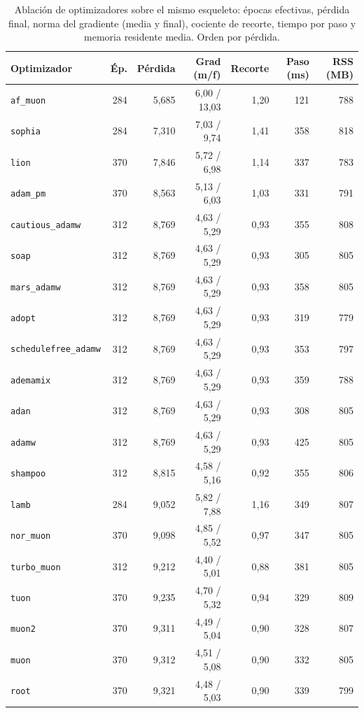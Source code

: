 \begin{table}[H]
\centering
\small
\caption{Ablación de optimizadores sobre el mismo esqueleto: épocas efectivas, pérdida final, norma del gradiente (media y final), cociente de recorte, tiempo por paso y memoria residente media. Orden por pérdida.}
\label{tab:r3-optimizers}
\begin{tabular}{lrrrrrr}
\toprule
Optimizador & Ép. & Pérdida & Grad (m/f) & Recorte & Paso (ms) & RSS (MB) \\
\midrule
\texttt{af\_muon} & 284 & 5,685 & 6,00 / 13,03 & 1,20 & 121 & 788 \\
\texttt{sophia} & 284 & 7,310 & 7,03 / 9,74 & 1,41 & 358 & 818 \\
\texttt{lion} & 370 & 7,846 & 5,72 / 6,98 & 1,14 & 337 & 783 \\
\texttt{adam\_pm} & 370 & 8,563 & 5,13 / 6,03 & 1,03 & 331 & 791 \\
\texttt{cautious\_adamw} & 312 & 8,769 & 4,63 / 5,29 & 0,93 & 355 & 808 \\
\texttt{soap} & 312 & 8,769 & 4,63 / 5,29 & 0,93 & 305 & 805 \\
\texttt{mars\_adamw} & 312 & 8,769 & 4,63 / 5,29 & 0,93 & 358 & 805 \\
\texttt{adopt} & 312 & 8,769 & 4,63 / 5,29 & 0,93 & 319 & 779 \\
\texttt{schedulefree\_adamw} & 312 & 8,769 & 4,63 / 5,29 & 0,93 & 353 & 797 \\
\texttt{ademamix} & 312 & 8,769 & 4,63 / 5,29 & 0,93 & 359 & 788 \\
\texttt{adan} & 312 & 8,769 & 4,63 / 5,29 & 0,93 & 308 & 805 \\
\texttt{adamw} & 312 & 8,769 & 4,63 / 5,29 & 0,93 & 425 & 805 \\
\texttt{shampoo} & 312 & 8,815 & 4,58 / 5,16 & 0,92 & 355 & 806 \\
\texttt{lamb} & 284 & 9,052 & 5,82 / 7,88 & 1,16 & 349 & 807 \\
\texttt{nor\_muon} & 370 & 9,098 & 4,85 / 5,52 & 0,97 & 347 & 805 \\
\texttt{turbo\_muon} & 312 & 9,212 & 4,40 / 5,01 & 0,88 & 381 & 805 \\
\texttt{tuon} & 370 & 9,235 & 4,70 / 5,32 & 0,94 & 329 & 809 \\
\texttt{muon2} & 370 & 9,311 & 4,49 / 5,04 & 0,90 & 328 & 807 \\
\texttt{muon} & 370 & 9,312 & 4,51 / 5,08 & 0,90 & 332 & 805 \\
\texttt{root} & 370 & 9,321 & 4,48 / 5,03 & 0,90 & 339 & 799 \\

\end{tabular}
\end{table}
